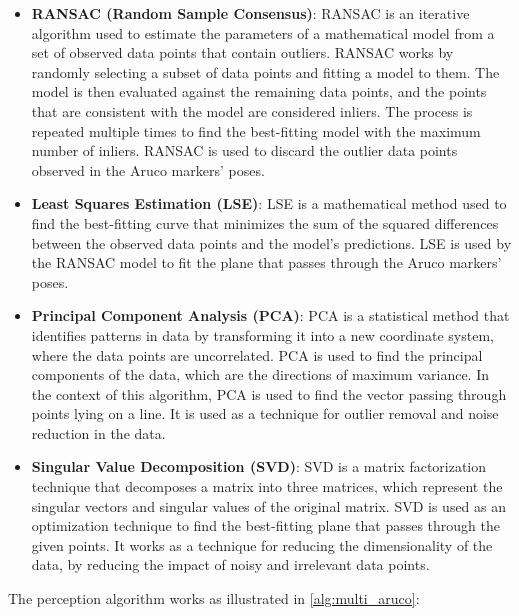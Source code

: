 \begin{itemize}
    \item \textbf{RANSAC (Random Sample Consensus)}: RANSAC is an iterative algorithm used to estimate
    the parameters of a mathematical model from a set of observed data points that contain outliers.
    RANSAC works by randomly selecting a subset of data points and fitting a model to them. The model is then
    evaluated against the remaining data points, and the points that are consistent with the model are considered
    inliers. The process is repeated multiple times to find the best-fitting model with the maximum number of inliers.
    RANSAC is used to discard the outlier data points observed in the Aruco markers' poses.
    \item \textbf{Least Squares Estimation (LSE)}: LSE is a mathematical method used to find the best-fitting curve
    that minimizes the sum of the squared differences between the observed data points and the model's predictions.
    LSE is used by the RANSAC model to fit the plane that passes through the Aruco markers' poses.
    \item \textbf{Principal Component Analysis (PCA)}: PCA is a statistical method that identifies patterns
    in data by transforming it into a new coordinate system, where the data points are uncorrelated.
    PCA is used to find the principal components of the data, which are the directions of maximum variance.
    In the context of this algorithm, PCA is used to find the vector passing through points lying on a line.
    It is used as a technique for outlier removal and noise reduction in the data.
    \item \textbf{Singular Value Decomposition (SVD)}: SVD is a matrix factorization technique that decomposes
    a matrix into three matrices, which represent the singular vectors and singular values of the original matrix.
    SVD is used as an optimization technique to find the best-fitting plane that passes through the given points.
    It works as a technique for reducing the dimensionality of the data, by reducing the impact of noisy
    and irrelevant data points.
\end{itemize}

The perception algorithm works as illustrated in \ref{alg:multi_aruco}:

